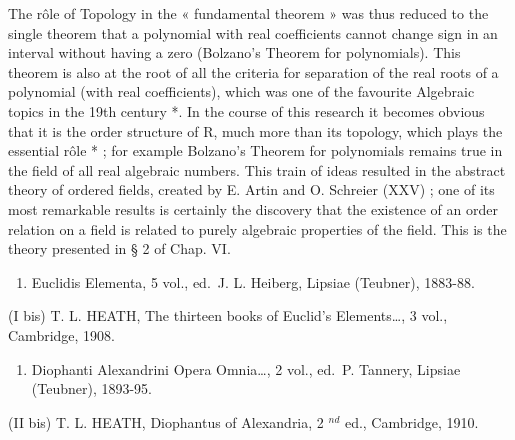 The rôle of Topology in the « fundamental theorem » was thus reduced to the single theorem that a polynomial with real coefficients cannot change sign in an interval without having a zero (Bolzano's Theorem for polynomials). This theorem is also at the root of all the criteria for separation of the real roots of a polynomial (with real coefficients), which was one of the favourite Algebraic topics in the 19th century *. In the course of this research it becomes obvious that it is the order structure of R, much more than its topology, which plays the essential rôle * ; for example Bolzano's Theorem for polynomials remains true in the field of all real algebraic numbers. This train of ideas resulted in the abstract theory of ordered fields, created by E. Artin and O. Schreier (XXV) ; one of its most remarkable results is certainly the discovery that the existence of an order relation on a field is related to purely algebraic properties of the field. This is the theory presented in § 2 of Chap. VI.


\begin{enumerate}
\def\labelenumi{(\Roman{enumi})}
\tightlist
\item
  Euclidis Elementa, 5 vol., ed.~J. L. Heiberg, Lipsiae (Teubner), 1883-88.
\end{enumerate}

(I bis) T. L. HEATH, The thirteen books of Euclid's Elements\ldots, 3 vol., Cambridge, 1908.

\begin{enumerate}
\def\labelenumi{(\Roman{enumi})}
\setcounter{enumi}{1}
\tightlist
\item
  Diophanti Alexandrini Opera Omnia\ldots, 2 vol., ed.~P. Tannery, Lipsiae (Teubner), 1893-95.
\end{enumerate}

(II bis) T. L. HEATH, Diophantus of Alexandria, 2 \(^{nd}\) ed., Cambridge, 1910.

